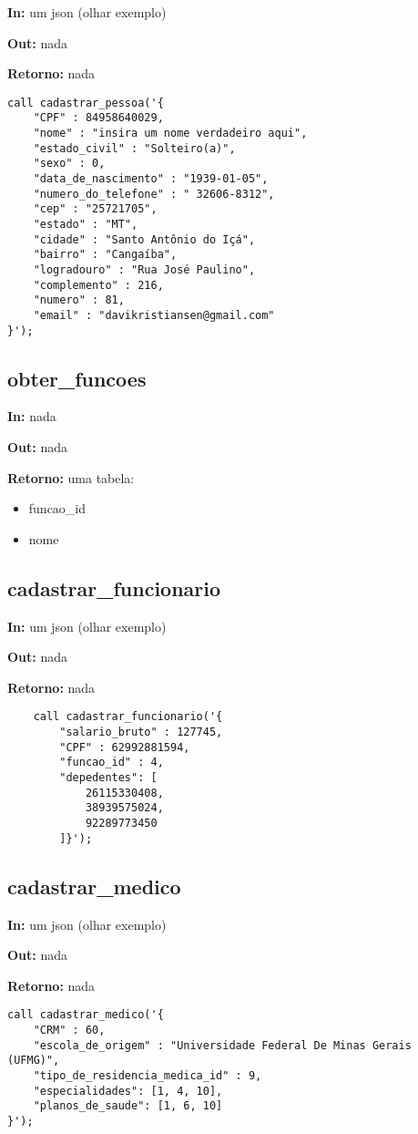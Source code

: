 \textbf{In:} um json (olhar exemplo)

\textbf{Out:} nada

\textbf{Retorno:} nada

\begin{verbatim}
call cadastrar_pessoa('{
	"CPF" : 84958640029,
	"nome" : "insira um nome verdadeiro aqui",
	"estado_civil" : "Solteiro(a)",
	"sexo" : 0,
	"data_de_nascimento" : "1939-01-05",
	"numero_do_telefone" : " 32606-8312",
	"cep" : "25721705",
	"estado" : "MT",
	"cidade" : "Santo Antônio do Içá",
	"bairro" : "Cangaíba",
	"logradouro" : "Rua José Paulino",
	"complemento" : 216,
	"numero" : 81,
	"email" : "davikristiansen@gmail.com"
}');
\end{verbatim}

\subsection{obter\_funcoes}

\textbf{In:} nada

\textbf{Out:} nada

\textbf{Retorno:} uma tabela:

\begin{itemize}
	\item funcao\_id
	\item nome
\end{itemize}

\subsection{cadastrar\_funcionario}
\textbf{In:} um json (olhar exemplo)

\textbf{Out:} nada

\textbf{Retorno:} nada

\begin{verbatim}
	call cadastrar_funcionario('{
		"salario_bruto" : 127745,
		"CPF" : 62992881594,
		"funcao_id" : 4,
		"depedentes": [
			26115330408,
			38939575024,
			92289773450
		]}');
\end{verbatim}

\subsection{cadastrar\_medico}
\textbf{In:} um json (olhar exemplo)

\textbf{Out:} nada

\textbf{Retorno:} nada

\begin{verbatim}
call cadastrar_medico('{
	"CRM" : 60,
	"escola_de_origem" : "Universidade Federal De Minas Gerais (UFMG)",
	"tipo_de_residencia_medica_id" : 9,
	"especialidades": [1, 4, 10],
	"planos_de_saude": [1, 6, 10]
}');
\end{verbatim}

